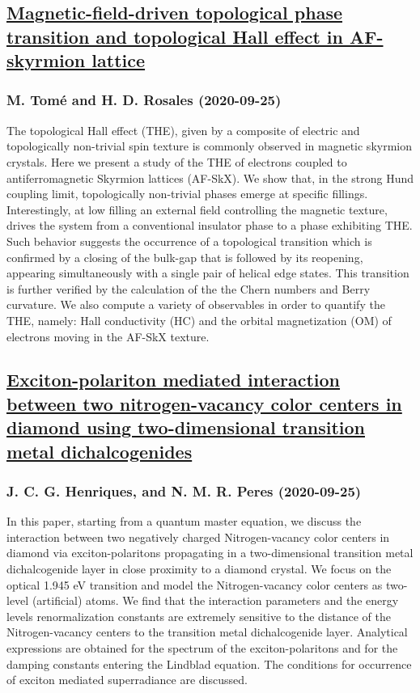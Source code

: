 \subsection*{\href{http://arxiv.org/abs/2009.12233v1}{Magnetic-field-driven topological phase transition and topological Hall  effect in AF-skyrmion lattice}}
\subsubsection*{M. Tomé and H. D. Rosales (2020-09-25)}
The topological Hall effect (THE), given by a composite of electric and
topologically non-trivial spin texture is commonly observed in magnetic
skyrmion crystals. Here we present a study of the THE of electrons coupled to
antiferromagnetic Skyrmion lattices (AF-SkX). We show that, in the strong Hund
coupling limit, topologically non-trivial phases emerge at specific fillings.
Interestingly, at low filling an external field controlling the magnetic
texture, drives the system from a conventional insulator phase to a phase
exhibiting THE. Such behavior suggests the occurrence of a topological
transition which is confirmed by a closing of the bulk-gap that is followed by
its reopening, appearing simultaneously with a single pair of helical edge
states. This transition is further verified by the calculation of the the Chern
numbers and Berry curvature. We also compute a variety of observables in order
to quantify the THE, namely: Hall conductivity (HC) and the orbital
magnetization (OM) of electrons moving in the AF-SkX texture.

\subsection*{\href{http://arxiv.org/abs/2009.12194v1}{Exciton-polariton mediated interaction between two nitrogen-vacancy  color centers in diamond using two-dimensional transition metal  dichalcogenides}}
\subsubsection*{J. C. G. Henriques, and N. M. R. Peres (2020-09-25)}
In this paper, starting from a quantum master equation, we discuss the
interaction between two negatively charged Nitrogen-vacancy color centers in
diamond via exciton-polaritons propagating in a two-dimensional transition
metal dichalcogenide layer in close proximity to a diamond crystal. We focus on
the optical 1.945 eV transition and model the Nitrogen-vacancy color centers as
two-level (artificial) atoms. We find that the interaction parameters and the
energy levels renormalization constants are extremely sensitive to the distance
of the Nitrogen-vacancy centers to the transition metal dichalcogenide layer.
Analytical expressions are obtained for the spectrum of the exciton-polaritons
and for the damping constants entering the Lindblad equation. The conditions
for occurrence of exciton mediated superradiance are discussed.

